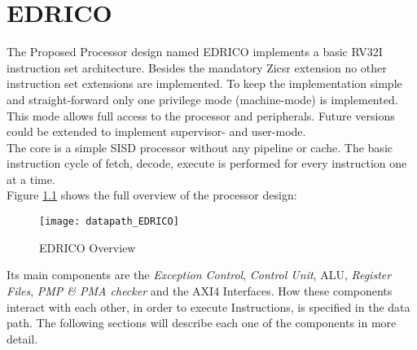 
\chapter{EDRICO}

The Proposed Processor design named \ac{EDRICO} implements a basic \ac{RV32I}
instruction set architecture. Besides the mandatory Zicsr extension no other
instruction set extensions are implemented. To keep the implementation simple and
straight-forward only one privilege mode (machine-mode) is implemented. This mode
allows full access to the processor and peripherals. Future versions could be
extended to implement supervisor- and user-mode.\\
The core is a simple \acf{SISD} processor without any pipeline or cache. The basic instruction cycle of fetch, decode, execute is performed for every instruction one at a time.\\
Figure \ref{fig:edricooverview} shows the full overview of the processor design:

\begin{figure}[H]
	\centering
	\texttt{[image: datapath\_EDRICO]}
	\caption{EDRICO Overview}
	\label{fig:edricooverview}
\end{figure}

Its main components are the \textit{Exception Control}, \textit{Control Unit}, \ac{ALU},
\textit{Register Files}, \textit{PMP \& PMA checker} and the \ac{AXI}4 Interfaces. How these components interact with each other, in order to execute Instructions, is specified in the data path.
The following sections will describe each one of the components in more detail.

